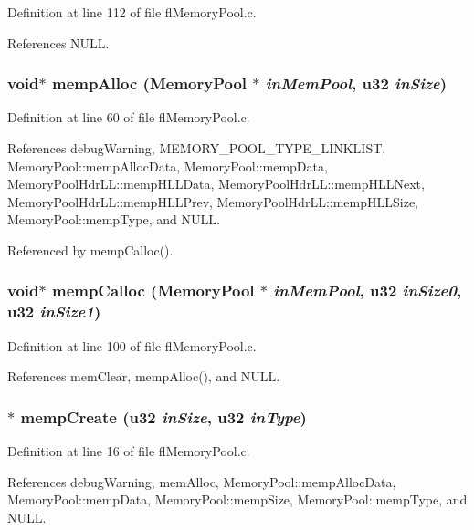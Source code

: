 Definition at line 112 of file fl\-Memory\-Pool.c.

References NULL.
\subsubsection{\setlength{\rightskip}{0pt plus 5cm}void$\ast$ memp\-Alloc ({\bf Memory\-Pool} $\ast$ {\em in\-Mem\-Pool}, u32 {\em in\-Size})}\label{flMemoryPool_8c_8347fb9bc94ce7ffbfeecd3a061524ae}




Definition at line 60 of file fl\-Memory\-Pool.c.

References debug\-Warning, MEMORY\_\-POOL\_\-TYPE\_\-LINKLIST, Memory\-Pool::memp\-Alloc\-Data, Memory\-Pool::memp\-Data, Memory\-Pool\-Hdr\-LL::memp\-HLLData, Memory\-Pool\-Hdr\-LL::memp\-HLLNext, Memory\-Pool\-Hdr\-LL::memp\-HLLPrev, Memory\-Pool\-Hdr\-LL::memp\-HLLSize, Memory\-Pool::memp\-Type, and NULL.

Referenced by memp\-Calloc().
\subsubsection{\setlength{\rightskip}{0pt plus 5cm}void$\ast$ memp\-Calloc ({\bf Memory\-Pool} $\ast$ {\em in\-Mem\-Pool}, u32 {\em in\-Size0}, u32 {\em in\-Size1})}\label{flMemoryPool_8c_22a72c10177a340b5451f0f21d7ae2a2}




Definition at line 100 of file fl\-Memory\-Pool.c.

References mem\-Clear, memp\-Alloc(), and NULL.
\subsubsection{$\ast$ memp\-Create (u32 {\em in\-Size}, u32 {\em in\-Type})}\label{flMemoryPool_8c_2dcdd7fd2c4b14a1f1c2a692d6d99e12}




Definition at line 16 of file fl\-Memory\-Pool.c.

References debug\-Warning, mem\-Alloc, Memory\-Pool::memp\-Alloc\-Data, Memory\-Pool::memp\-Data, Memory\-Pool::memp\-Size, Memory\-Pool::memp\-Type, and NULL.
